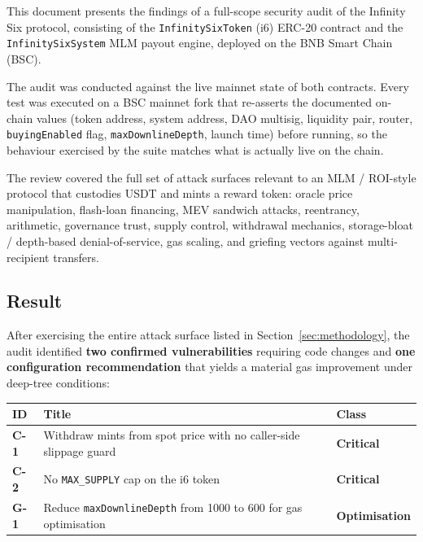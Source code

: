 \documentclass[11pt,a4paper]{article}
\begin{document}
This document presents the findings of a full-scope security audit of the
Infinity Six protocol, consisting of the \texttt{InfinitySixToken} (i6) ERC-20
contract and the \texttt{InfinitySixSystem} MLM payout engine, deployed on the
BNB Smart Chain (BSC).

The audit was conducted against the live mainnet state of both contracts.
Every test was executed on a BSC mainnet fork that re-asserts the documented
on-chain values (token address, system address, DAO multisig, liquidity pair,
router, \texttt{buyingEnabled} flag, \texttt{maxDownlineDepth}, launch time)
before running, so the behaviour exercised by the suite matches what is
actually live on the chain.

The review covered the full set of attack surfaces relevant to an MLM /
ROI-style protocol that custodies USDT and mints a reward token: oracle price
manipulation, flash-loan financing, MEV sandwich attacks, reentrancy,
arithmetic, governance trust, supply control, withdrawal mechanics,
storage-bloat / depth-based denial-of-service, gas scaling, and griefing
vectors against multi-recipient transfers.

\subsection*{Result}

After exercising the entire attack surface listed in
Section~\ref{sec:methodology}, the audit identified
\textbf{two confirmed vulnerabilities} requiring code changes and
\textbf{one configuration recommendation} that yields a material gas
improvement under deep-tree conditions:

\begin{center}
\renewcommand{\arraystretch}{1.35}
\begin{tabular}{>{\bfseries}p{2.4cm} p{8.6cm} >{\centering\arraybackslash}p{2.6cm}}
\toprule
\textbf{ID} & \textbf{Title} & \textbf{Class} \\
\midrule
C-1 & Withdraw mints from spot price with no caller-side slippage guard
    & \textcolor{critred}{\textbf{Critical}} \\
C-2 & No \texttt{MAX\_SUPPLY} cap on the i6 token
    & \textcolor{critred}{\textbf{Critical}} \\
G-1 & Reduce \texttt{maxDownlineDepth} from 1000 to 600 for gas optimisation
    & \textcolor{optblue}{\textbf{Optimisation}} \\
\bottomrule
\end{tabular}
\end{center}
\end{document}
